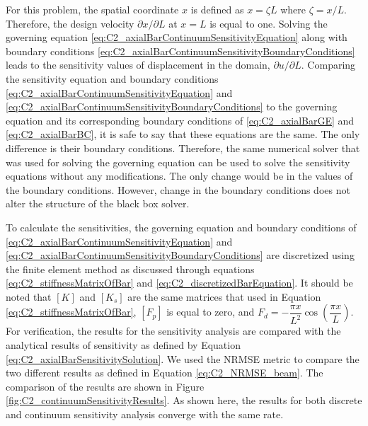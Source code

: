 For this problem, the spatial coordinate $x$ is defined as $x = \zeta L$ where $\zeta = x / L$. Therefore, the design velocity $\partial x/\partial L$ at $x = L$ is equal to one. Solving the governing equation \eqref{eq:C2_axialBarContinuumSensitivityEquation} along with boundary conditions \eqref{eq:C2_axialBarContinuumSensitivityBoundaryConditions} leads to the sensitivity values of displacement in the domain, $\partial u/\partial L$. Comparing the sensitivity equation and boundary conditions \eqref{eq:C2_axialBarContinuumSensitivityEquation} and \eqref{eq:C2_axialBarContinuumSensitivityBoundaryConditions} to the governing equation and its corresponding boundary conditions of \eqref{eq:C2_axialBarGE} and \eqref{eq:C2_axialBarBC}, it is safe to say that these equations are the same. The only difference is their boundary conditions. Therefore, the same numerical solver that was used for solving the governing equation can be used to solve the sensitivity equations without any modifications. The only change would be in the values of the boundary conditions. However, change in the boundary conditions does not alter the structure of the black box solver.

To calculate the sensitivities, the governing equation and boundary conditions of \eqref{eq:C2_axialBarContinuumSensitivityEquation} and \eqref{eq:C2_axialBarContinuumSensitivityBoundaryConditions} are discretized using the finite element method as discussed through equations \eqref{eq:C2_stiffnessMatrixOfBar} and \eqref{eq:C2_discretizedBarEquation}. It should be noted that $[K]$ and $[K_s]$ are the same matrices that used in Equation \eqref{eq:C2_stiffnessMatrixOfBar}, $[F_p]$ is equal to zero, and $F_d = -\dfrac{\pi x}{L^2} \cos \left( \dfrac{\pi x}{L} \right)$. For verification, the results for the sensitivity analysis are compared with the analytical results of sensitivity as defined by Equation \eqref{eq:C2_axialBarSensitivitySolution}. We used the NRMSE metric to compare the two different results as defined in Equation \eqref{eq:C2_NRMSE_beam}. The comparison of the results are shown in Figure \ref{fig:C2_continuumSensitivityResults}. As shown here, the results for both discrete and continuum sensitivity analysis converge with the same rate.

